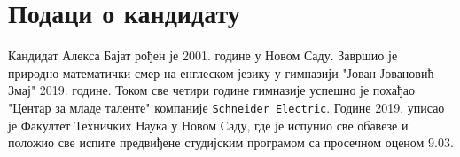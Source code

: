 \section{Подаци о кандидату}


Кандидат Алекса Бајат рођен је 2001. године у Новом Саду. Завршио је природно-математички смер на енглеском језику 
у гимназији "Јован Јовановић Змај" 2019. године. Током све четири године гимназије успешно је похађао 
"Центар за младе таленте" компаније \verb|Schneider Electric|.  Године 2019. уписао је Факултет 
Техничких Наука у Новом Саду, где је испунио све обавезе и положио све испите предвиђене 
студијским програмом са просечном оценом 9.03. 